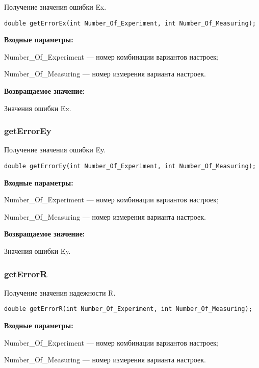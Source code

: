 Получение значения ошибки Ex.


\begin{lstlisting}[label=code_syntax_getErrorEx,caption=Синтаксис]
double getErrorEx(int Number_Of_Experiment, int Number_Of_Measuring);
\end{lstlisting}

\textbf{Входные параметры:}

Number\_Of\_Experiment --- номер комбинации вариантов настроек;
 
    Number\_Of\_Measuring --- номер измерения варианта настроек.

\textbf{Возвращаемое значение:}

Значения ошибки Ex.


\subsubsection{getErrorEy}\label{getErrorEy}

Получение значения ошибки Ey.


\begin{lstlisting}[label=code_syntax_getErrorEy,caption=Синтаксис]
double getErrorEy(int Number_Of_Experiment, int Number_Of_Measuring);
\end{lstlisting}

\textbf{Входные параметры:}

Number\_Of\_Experiment --- номер комбинации вариантов настроек;
 
    Number\_Of\_Measuring --- номер измерения варианта настроек.

\textbf{Возвращаемое значение:}

Значения ошибки Ey.


\subsubsection{getErrorR}\label{getErrorR}

Получение значения надежности R.


\begin{lstlisting}[label=code_syntax_getErrorR,caption=Синтаксис]
double getErrorR(int Number_Of_Experiment, int Number_Of_Measuring);
\end{lstlisting}

\textbf{Входные параметры:}

Number\_Of\_Experiment --- номер комбинации вариантов настроек;
 
    Number\_Of\_Measuring --- номер измерения варианта настроек.

